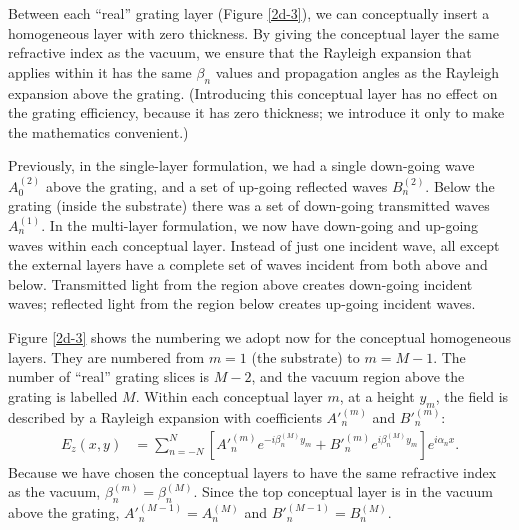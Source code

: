 Between each ``real'' grating layer (Figure \ref{2d-3}), we can conceptually insert a homogeneous layer with zero thickness.  By giving the conceptual layer the same refractive index as the vacuum, we ensure that the Rayleigh expansion that applies within it has the same $\beta_n$ values and propagation angles as the Rayleigh expansion above the grating.  (Introducing this conceptual layer has no effect on the grating efficiency, because it has zero thickness; we introduce it only to make the mathematics convenient.)

Previously, in the single-layer formulation, we had a single down-going wave $A^{(2)}_0$ above the grating, and a set of up-going reflected waves $B^{(2)}_n$.  Below the grating (inside the substrate) there was a set of down-going transmitted waves $A^{(1)}_n$.  In the multi-layer formulation, we now have down-going and up-going waves within each conceptual layer.  Instead of just one incident wave, all except the external layers have a complete set of waves incident from both above and below.  Transmitted light from the region above creates down-going incident waves; reflected light from the region below creates up-going incident waves.

Figure \ref{2d-3} shows the numbering we adopt now for the conceptual homogeneous layers.  They are numbered from $m=1$ (the substrate) to $m=M-1$.  The number of ``real'' grating slices is $M-2$, and the vacuum region above the grating is labelled  $M$.  Within each conceptual layer $m$, at a height $y_m$, the field is described by a Rayleigh expansion with coefficients $A'^{(m)}_n$ and $B'^{(m)}_n$:
\begin{align}
E_z(x,y) &= \sum\limits_{n=-N}^{N} \left[ A'^{(m)}_n  e^{-i \beta^{(M)}_n y_m}   +  B'^{(m)}_n e^{i \beta^{(M)}_n y_m} \right] e^{i \alpha_n x}.
\label{rayleighS}
\end{align}
Because we have chosen the conceptual layers to have the same refractive index as the vacuum, $\beta^{(m)}_n = \beta^{(M)}_n$.  Since the top conceptual layer is in the vacuum above the grating, $A'^{(M-1)}_n = A^{(M)}_n$ and $B'^{(M-1)}_n = B^{(M)}_n$.


